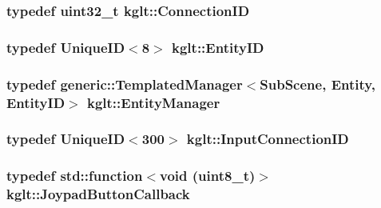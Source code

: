\hypertarget{namespacekglt_af34ceb611710ae87f8b3a6099eb1e66e}{
\subsubsection[{Connection\-I\-D}]{\setlength{\rightskip}{0pt plus 5cm}typedef uint32\-\_\-t {\bf kglt\-::\-Connection\-I\-D}}}\label{namespacekglt_af34ceb611710ae87f8b3a6099eb1e66e}
\hypertarget{namespacekglt_a693458ae13c224ae3ea4074ac3a0b02a}{
\subsubsection[{Entity\-I\-D}]{\setlength{\rightskip}{0pt plus 5cm}typedef {\bf Unique\-I\-D}$<$8$>$ {\bf kglt\-::\-Entity\-I\-D}}}\label{namespacekglt_a693458ae13c224ae3ea4074ac3a0b02a}
\hypertarget{namespacekglt_a8677c357131c7745e0bf278a777478c6}{
\subsubsection[{Entity\-Manager}]{\setlength{\rightskip}{0pt plus 5cm}typedef {\bf generic\-::\-Templated\-Manager}$<${\bf Sub\-Scene}, {\bf Entity}, {\bf Entity\-I\-D}$>$ {\bf kglt\-::\-Entity\-Manager}}}\label{namespacekglt_a8677c357131c7745e0bf278a777478c6}
\hypertarget{namespacekglt_a8caf8fb4921e53068cbd719f2652a52e}{
\subsubsection[{Input\-Connection\-I\-D}]{\setlength{\rightskip}{0pt plus 5cm}typedef {\bf Unique\-I\-D}$<$300$>$ {\bf kglt\-::\-Input\-Connection\-I\-D}}}\label{namespacekglt_a8caf8fb4921e53068cbd719f2652a52e}
\hypertarget{namespacekglt_a020048fdd1dc93e7e1d1b23662df4d4d}{
\subsubsection[{Joypad\-Button\-Callback}]{\setlength{\rightskip}{0pt plus 5cm}typedef std\-::function$<$void (uint8\-\_\-t)$>$ {\bf kglt\-::\-Joypad\-Button\-Callback}}}\label{namespacekglt_a020048fdd1dc93e7e1d1b23662df4d4d}
